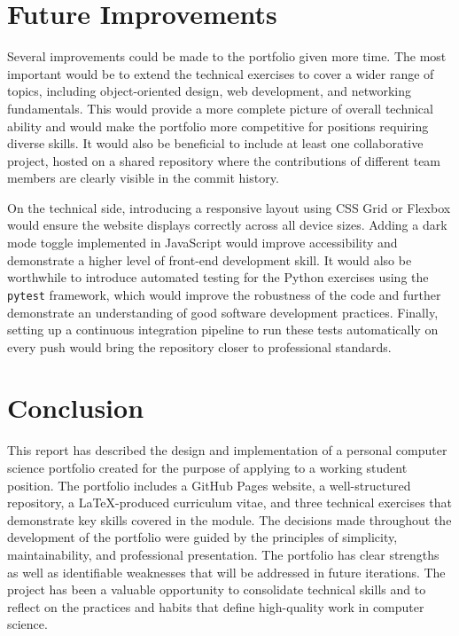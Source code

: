 \documentclass[12pt,a4paper]{article}
\begin{document}
\section{Future Improvements}

Several improvements could be made to the portfolio given more time. The most important would be to extend the technical exercises to cover a wider range of topics, including object-oriented design, web development, and networking fundamentals. This would provide a more complete picture of overall technical ability and would make the portfolio more competitive for positions requiring diverse skills. It would also be beneficial to include at least one collaborative project, hosted on a shared repository where the contributions of different team members are clearly visible in the commit history.

On the technical side, introducing a responsive layout using CSS Grid or Flexbox would ensure the website displays correctly across all device sizes. Adding a dark mode toggle implemented in JavaScript would improve accessibility and demonstrate a higher level of front-end development skill. It would also be worthwhile to introduce automated testing for the Python exercises using the \texttt{pytest} framework, which would improve the robustness of the code and further demonstrate an understanding of good software development practices. Finally, setting up a continuous integration pipeline to run these tests automatically on every push would bring the repository closer to professional standards.

\section{Conclusion}

This report has described the design and implementation of a personal computer science portfolio created for the purpose of applying to a working student position. The portfolio includes a GitHub Pages website, a well-structured repository, a \LaTeX-produced curriculum vitae, and three technical exercises that demonstrate key skills covered in the module. The decisions made throughout the development of the portfolio were guided by the principles of simplicity, maintainability, and professional presentation. The portfolio has clear strengths as well as identifiable weaknesses that will be addressed in future iterations. The project has been a valuable opportunity to consolidate technical skills and to reflect on the practices and habits that define high-quality work in computer science.
\end{document}
